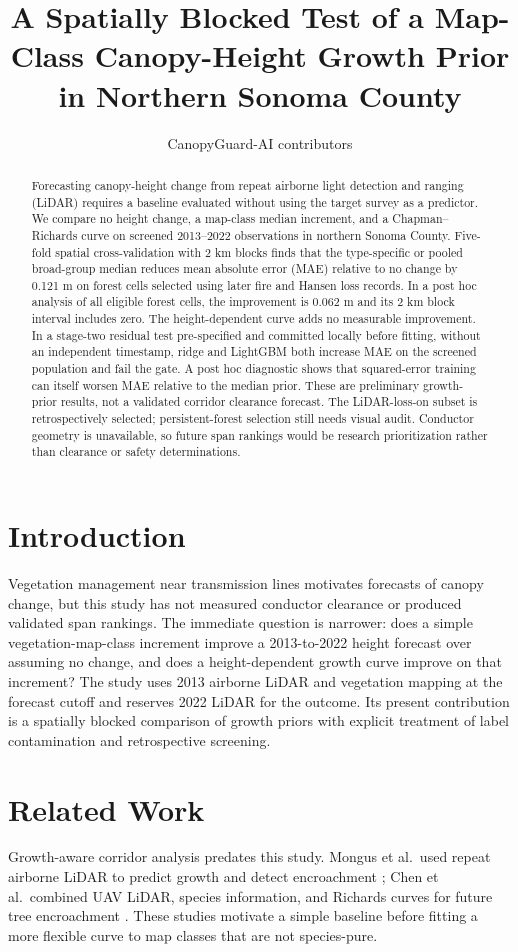 \documentclass[11pt]{article}
\title{A Spatially Blocked Test of a Map-Class Canopy-Height Growth Prior in Northern Sonoma County}
\author{CanopyGuard-AI contributors}
\date{}
\begin{document}
\maketitle
\begin{abstract}
Forecasting canopy-height change from repeat airborne light detection and
ranging (LiDAR) requires a baseline evaluated without using the target survey
as a predictor. We compare no height change, a map-class median increment,
and a Chapman--Richards curve on screened 2013--2022 observations in northern
Sonoma County. Five-fold spatial cross-validation with 2 km blocks finds
that the type-specific or pooled broad-group median reduces mean absolute
error (MAE) relative to no change by 0.121 m on forest cells selected
using later fire and Hansen loss records. In a post hoc analysis of all
eligible forest cells, the improvement is 0.062 m and its 2 km block
interval includes zero. The height-dependent curve adds no measurable
improvement. In a stage-two residual test pre-specified and committed
locally before fitting, without an independent timestamp, ridge and
LightGBM both increase MAE on the screened population and fail
the gate. A post hoc diagnostic shows that squared-error training can
itself worsen MAE relative to the median prior. These are preliminary
growth-prior results, not a validated
corridor clearance forecast. The LiDAR-loss-on subset is retrospectively
selected; persistent-forest selection still needs visual audit.
Conductor geometry is unavailable, so future span rankings would be
research prioritization rather than clearance or safety determinations.
\end{abstract}

\section{Introduction}
Vegetation management near transmission lines motivates forecasts of canopy
change, but this study has not measured conductor clearance or produced
validated span rankings. The immediate question is narrower: does a simple
vegetation-map-class increment improve a 2013-to-2022 height forecast over
assuming no change, and does a height-dependent growth curve improve on that
increment? The study uses 2013 airborne LiDAR and vegetation mapping at the
forecast cutoff and reserves 2022 LiDAR for the outcome. Its present
contribution is a spatially blocked comparison of growth priors with
explicit treatment of label contamination and retrospective screening.

\section{Related Work}
Growth-aware corridor analysis predates this study. Mongus et al.\ used
repeat airborne LiDAR to predict growth and detect encroachment
\cite{mongus2021}; Chen et al.\ combined UAV LiDAR, species information,
and Richards curves for future tree encroachment \cite{chen2022}. These
studies motivate a simple baseline before fitting a more flexible curve
to map classes that are not species-pure.
\end{document}
